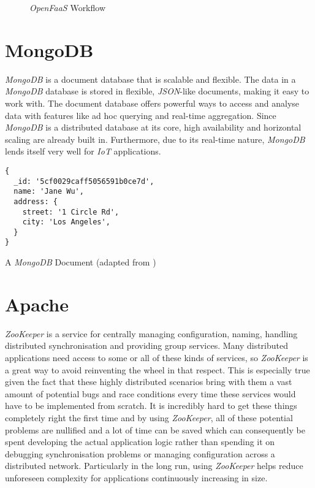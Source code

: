 \begin{figure}[H]
  \centering
  \caption{\textit{OpenFaaS} Workflow \cite{openfaas-docs}}
\end{figure}

\section{MongoDB}

\textit{MongoDB} is a document database that is scalable and flexible. The data in a
\textit{MongoDB} database is stored in flexible, \textit{JSON}-like documents, making it easy to
work with. The document database offers powerful ways to access and analyse data with features like
ad hoc querying and real-time aggregation. Since \textit{MongoDB} is a distributed database at its
core, high availability and horizontal scaling are already built in. Furthermore, due to its
real-time nature, \textit{MongoDB} lends itself very well for \textit{IoT} applications.
\cite{mongodb-description}

\begin{code}[H]
  \centering
  \begin{lstlisting}[language=mongo]
{
  _id: '5cf0029caff5056591b0ce7d',
  name: 'Jane Wu',
  address: {
    street: '1 Circle Rd',
    city: 'Los Angeles',
  }
}
  \end{lstlisting}
  \caption{A \textit{MongoDB} Document (adapted from \cite{mongodb-description})}
\end{code}

\section{Apache }
\label{sec:background-zookeeper}

\textit{ZooKeeper} is a service for centrally managing configuration, naming, handling distributed
synchronisation and providing group services. Many distributed applications need access to some or
all of these kinds of services, so \textit{ZooKeeper} is a great way to avoid reinventing the wheel
in that respect. This is especially true given the fact that these highly distributed scenarios
bring with them a vast amount of potential bugs and race conditions every time these services would
have to be implemented from scratch. It is incredibly hard to get these things completely right the
first time and by using \textit{ZooKeeper}, all of these potential problems are nullified and a lot
of time can be saved which can consequently be spent developing the actual application logic rather
than spending it on debugging synchronisation problems or managing configuration across a
distributed network. Particularly in the long run, using \textit{ZooKeeper} helps reduce unforeseen
complexity for applications continuously increasing in size.
\cite{zookeeper-homepage}

